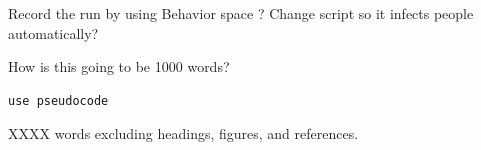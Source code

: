 \documentclass[11pt]{article} %
\begin{document}
Record the run by using Behavior space ?
Change script so it infects people automatically?

How is this going to be 1000 words? 



\begin{verbatim}
use pseudocode
\end{verbatim}








XXXX words excluding headings, figures, and references. \\
\nocite{*}


\printbibliography
\end{document}
